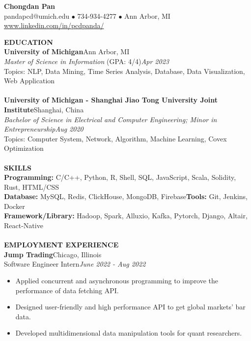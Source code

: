\documentclass[10pt,a4paper]{article}
\begin{document}
\begin{center}
    \Large{\textbf{Chongdan Pan}}\\
    \normalsize{pandapcd@umich.edu $\bullet$ 734-934-4277 $\bullet$ Ann Arbor, MI}\\
    \normalsize{\href{https://www.linkedin.com/in/pcdpanda/}{www.linkedin.com/in/pcdpanda/}}
\end{center}
\noindent
\rlap{\rule[-1mm]{\linewidth}{.5mm}}\textbf{\large{EDUCATION}}\\
\noindent\textbf{University of Michigan}\hfill Ann Arbor, MI\\
\emph{Master of Science in Information} (GPA: 4/4)\hfill\emph{Apr 2023}\\
Topics: NLP, Data Mining, Time Series Analysis, Database, Data Visualization, Web Application\\\\
\textbf{University of Michigan - Shanghai Jiao Tong University Joint Institute}\hfill Shanghai, China\\
\emph{Bachelor of Science in Electrical and Computer Engineering; Minor in Entrepreneurship}\hfill\emph{Aug 2020}\\
Topics: Computer System, Network, Algorithm, Machine Learning, Covex Optimization\\\\
\noindent
\rlap{\rule[-1mm]{\linewidth}{.5mm}}\textbf{\large{SKILLS}}\\
\textbf{Programming: }C/C++, Python, R, Shell, SQL, JavaScript, Scala, Solidity, Rust, HTML/CSS\\
\textbf{Database: }MySQL, Redis, ClickHouse, MongoDB, Firebase\qquad\textbf{Tools: }Git, Jenkins, Docker\\
\textbf{Framework/Library: }Hadoop, Spark, Alluxio, Kafka, Pytorch, Django, Altair, React-Native\\\\
\noindent
\rlap{\rule[-1mm]{\linewidth}{.5mm}}\textbf{\large{EMPLOYMENT EXPERIENCE}}\\
\textbf{Jump Trading}\hfill Chicago, Illinois\\
Software Engineer Intern\hfill\emph{June 2022 - Aug 2022}
\begin{itemize}[noitemsep,topsep=0pt]
    \item Applied concurrent and asynchronous programming to improve the performance of data fetching API.
    \item Designed user-friendly and high performance API to get global markets' bar data. 
    \item Developed multidimensional data manipulation tools for quant researchers.
\end{itemize}
\end{document}
